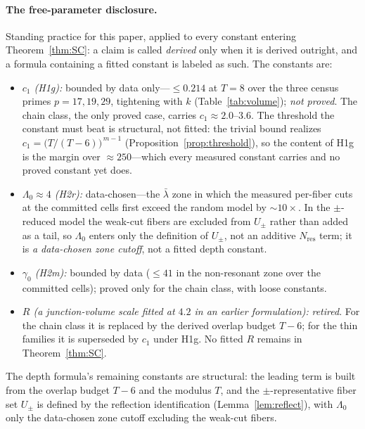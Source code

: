 \paragraph{The free-parameter disclosure.}
Standing practice for this paper, applied to every constant entering
Theorem~\ref{thm:SC}: a claim is called \emph{derived} only when it is
derived outright, and a formula containing a fitted constant is labeled
as such. The constants are:
\begin{itemize}[leftmargin=2.2em,itemsep=2pt,topsep=2pt]
\item \emph{$c_1$ (H1g):} bounded by data only---$\le 0.214$ at $T=8$
  over the three census primes $p=17,19,29$, tightening with $k$
  (Table~\ref{tab:volume}); \emph{not proved}. The chain class, the only
  proved case, carries $c_1\approx 2.0$--$3.6$. The threshold the
  constant must beat is structural, not fitted: the trivial bound
  realizes $c_1=\bigl(T/(T-6)\bigr)^{\,m-1}$
  (Proposition~\ref{prop:threshold}), so the content of H1g is the
  margin over $\approx250$---which every measured constant carries and
  no proved constant yet does.
\item \emph{$\Lambda_0\approx 4$ (H2r):} data-chosen---the $\bar\lambda$ zone in
which the measured per-fiber cuts at the committed cells first exceed the random
model by $\sim 10\times$. In the $\pm$-reduced model the weak-cut fibers are
excluded from $U_\pm$ rather than added as a tail, so $\Lambda_0$ enters only
the definition of $U_\pm$, not an additive $N_{\mathrm{res}}$ term; it is
\emph{a data-chosen zone cutoff}, not a fitted depth constant.
\item \emph{$\gamma_0$ (H2m):} bounded by data ($\le 41$ in the
  non-resonant zone over the committed cells); proved only for the chain
  class, with loose constants.
\item \emph{$R$ (a junction-volume scale fitted at $4.2$ in an earlier
  formulation):} \emph{retired}. For the chain class it is replaced by
  the derived overlap budget $T-6$; for the thin families it is
  superseded by $c_1$ under H1g. No fitted $R$ remains in
  Theorem~\ref{thm:SC}.
\end{itemize}
The depth formula's remaining constants are structural: the leading
term is built from the overlap budget $T-6$ and the modulus $T$, and the
$\pm$-representative fiber set $U_\pm$ is defined by the reflection
identification (Lemma~\ref{lem:reflect}), with $\Lambda_0$ only the
data-chosen zone cutoff excluding the weak-cut fibers.

